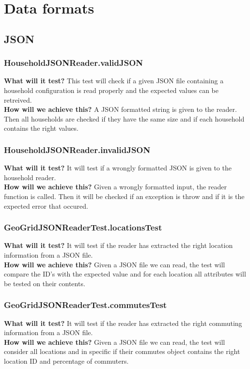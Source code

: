 \documentclass{article}
\begin{document}
\section{Data formats}
\subsection{JSON}
\subsubsection{HouseholdJSONReader.validJSON}
\textbf{What will it test?}
This test will check if a given JSON file containing a household configuration is read properly and the expected values can be retreived. \\
\newline
\textbf{How will we achieve this?}
A JSON formatted string is given to the reader. Then all households are checked if they have the same size and if each household contains the right values.

\subsubsection{HouseholdJSONReader.invalidJSON}
\textbf{What will it test?}
It will test if a wrongly formatted JSON is given to the household reader.\\
\newline
\textbf{How will we achieve this?}
Given a wrongly formatted input, the reader function is called. Then it will be checked if an exception is throw and if it is the expected error that occured.

\subsubsection{GeoGridJSONReaderTest.locationsTest}
\textbf{What will it test?}
It will test if the reader has extracted the right location information from a JSON file. \\
\newline
\textbf{How will we achieve this?}
Given a JSON file we can read, the test will compare the ID's with the expected value and for each location all attributes will be tested on their contents.

\subsubsection{GeoGridJSONReaderTest.commutesTest}
\textbf{What will it test?}
It will test if the reader has extracted the right commuting information from a JSON file. \\
\newline
\textbf{How will we achieve this?}
Given a JSON file we can read, the test will consider all locations and in specific if their commutes object contains the right location ID and percentage of commuters.
\end{document}
